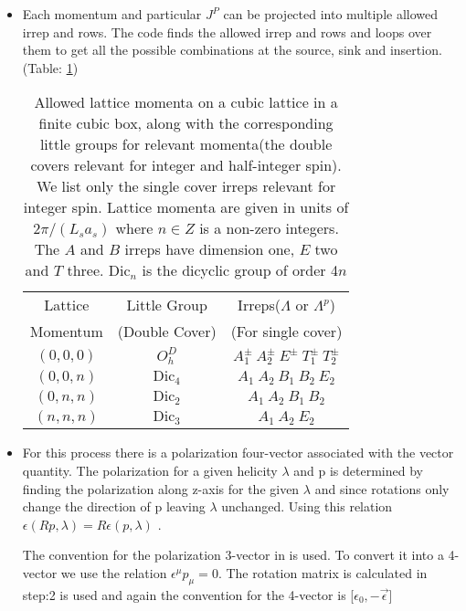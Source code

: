 \documentclass[10pt]{article}
\begin{document}
\begin{itemize}
	\item Each momentum and particular $J^P$  can be projected into multiple allowed irrep and rows. The code finds the allowed irrep and rows and loops over them to get all the possible combinations at the source, sink and insertion. (Table: \ref{irrep_table})

\begin{table}[!htbp]
\centering
\hspace{9mm}
\begin{minipage}{0.5\linewidth}
\begin{tabular}{c|c|c}

Lattice & Little Group & Irreps($\Lambda$ or $\Lambda^p$) \\ 
Momentum & (Double Cover) & (For single cover)\\

\hline

$(0,0,0)$ & $O^{D}_h$ & $A_1^{\pm} \ A_2^{\pm} \ E^{\pm} \ T_1^{\pm} \ T_2^{\pm}$\\ 
$(0,0,n)$ & $\mbox{Dic}_4$ & $A_1 \ A_2 \ B_1 \ B_2 \ E_2 $\\
$(0,n,n)$ & $\mbox{Dic}_2$ & $A_1 \ A_2 \ B_1 \ B_2 $\\
$(n,n,n)$ & $\mbox{Dic}_3$ & $A_1 \ A_2 \ E_2 $\\

\end{tabular}
\end{minipage}
\caption{Allowed lattice momenta on a cubic lattice in a finite cubic box, along with the corresponding little groups for relevant momenta(the double covers relevant for integer and half-integer spin). We list only the single cover irreps relevant for integer spin. Lattice momenta are given in units of $2\pi/(L_s a_s )$ where $n \in Z$  is a non-zero integers. The $A$ and $B$ irreps have dimension one, $E$ two
and $T$ three. Dic$_{n}$ is the dicyclic group of order 4$n$}
\label{irrep_table}
\end{table}


	\item For this process there is a  polarization four-vector associated with  the vector quantity. The polarization for a given helicity $\lambda$ and p is determined by finding the polarization along z-axis for the given $\lambda$ and since rotations only change the direction of p leaving $\lambda$ unchanged. Using this relation $\epsilon(Rp, \lambda) = R\epsilon(p,\lambda)$ \cite{hel}. \par The convention for the polarization 3-vector in \cite{hel} is used. To convert it into a 4-vector we use the relation $\epsilon^{\mu}p_{\mu} = 0$. The rotation matrix is calculated in step:2 is used and again the convention for the 4-vector is [$\epsilon_0,-\vec{\epsilon}$]


\end{itemize}
\end{document}
